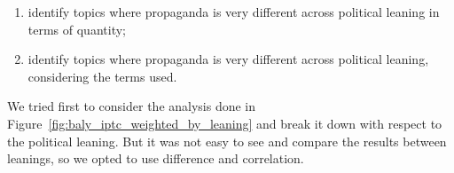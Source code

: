 \begin{enumerate}
    \item identify topics where propaganda is very different across political leaning in terms of quantity;
    \item identify topics where propaganda is very different across political leaning, considering the terms used.
\end{enumerate}

We tried first to consider the analysis done in Figure~\ref{fig:baly_iptc_weighted_by_leaning} and break it down with respect to the political leaning. But it was not easy to see and compare the results between leanings, so we opted to use difference and correlation. 












